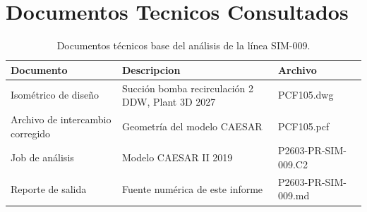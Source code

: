 \appendix
\section{Documentos Tecnicos Consultados}
\label{appendix:documentos}

\begin{table}[htbp]
    \centering
    \footnotesize
    \caption{Documentos t\'{e}cnicos base del an\'{a}lisis de la l\'{i}nea SIM-009.}
    \label{tab:planos}
    \begin{tabular}{@{}lll@{}}
        \toprule
        \textbf{Documento} & \textbf{Descripcion} & \textbf{Archivo} \\
        \midrule
        Isom\'{e}trico de dise\~{n}o & Succión bomba recirculación 2 DDW, Plant 3D 2027 & PCF105.dwg \\
        Archivo de intercambio corregido & Geometr\'{i}a del modelo CAESAR & PCF105.pcf \\
        Job de an\'{a}lisis & Modelo CAESAR II 2019 & P2603-PR-SIM-009.C2 \\
        Reporte de salida & Fuente num\'{e}rica de este informe & P2603-PR-SIM-009.md \\
        \bottomrule
    \end{tabular}
\end{table}
